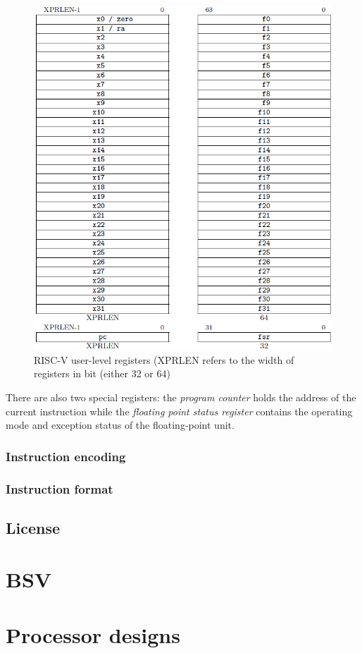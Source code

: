 \documentclass[12pt,oneside,a4paper]{article}
\begin{document}
\begin{figure}[h]
	\centering
	\includegraphics[scale=0.8]{risc-v_registers}
	\caption{RISC-V user-level registers (XPRLEN refers to the width of registers in bit (either 32 or 64)}
	\label{riscv:registers}
\end{figure}

There are also two special registers: the \textit{program counter} {\selectfont{pc}} holds the address of the current instruction while the \textit{floating point status register} {\selectfont{fsr}} contains the operating mode and exception status of the floating-point unit.
\subsubsection{Instruction encoding}
\subsubsection{Instruction format}
\subsection{License}
\section{BSV}
\section{Processor designs}
\newpage
\printbibliography
\end{document}

